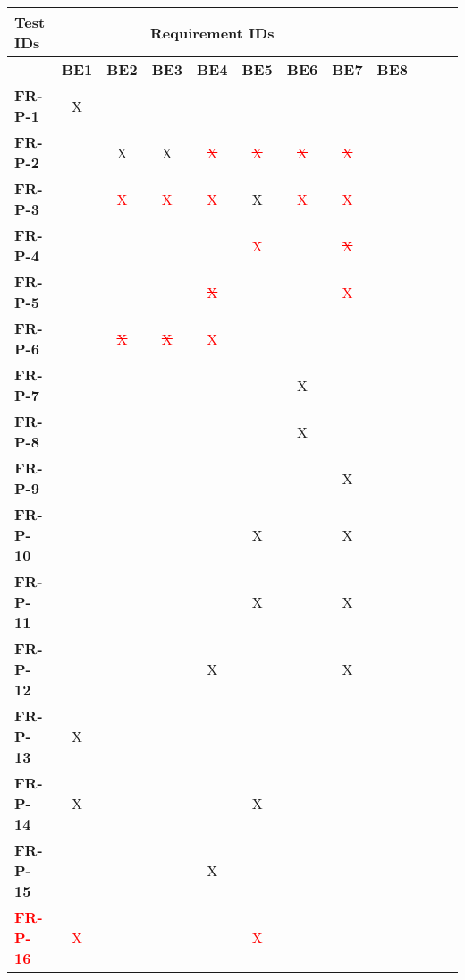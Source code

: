 \documentclass[12pt, titlepage]{article}
\begin{document}
\begin{table}[H]
    \centering
    \begin{adjustbox}{max width=0.7\paperwidth}
    \begin{tabular}{l|ccccccccccc}
        \textbf{Test IDs} & \multicolumn{7}{c}{\textbf{Requirement IDs}}\\
        \hline
        ~ & \textbf{BE1} & \textbf{BE2} & \textbf{BE3} & \textbf{BE4} & \textbf{BE5} & \textbf{BE6} & \textbf{BE7} & \textbf{BE8}\\
        \textbf{FR-P-1}    & X & ~ & ~ & ~ & ~ & ~ & ~ & ~\\
        \textbf{FR-P-2}    & ~ & X & X & \textcolor{red}{\sout{X}} & \textcolor{red}{\sout{X}} & \textcolor{red}{\sout{X}} & \textcolor{red}{\sout{X}} & ~\\
        \textbf{FR-P-3}    & ~ & \textcolor{red}{X} & \textcolor{red}{X} & \textcolor{red}{X} & X & \textcolor{red}{X} & \textcolor{red}{X} & ~\\
        \textbf{FR-P-4}    & ~ & ~ & ~ & ~ & \textcolor{red}{X} & ~ & \textcolor{red}{\sout{X}} & ~\\
        \textbf{FR-P-5}    & ~ & ~ & ~ & \textcolor{red}{\sout{X}} & ~ & ~ & \textcolor{red}{X} & ~\\
        \textbf{FR-P-6}    & ~ & \textcolor{red}{\sout{X}} & \textcolor{red}{\sout{X}} & \textcolor{red}{X} & ~ & ~ & ~ & ~\\
        \textbf{FR-P-7}    & ~ & ~ & ~ & ~ & ~ & X & ~ & ~\\
        \textbf{FR-P-8}    & ~ & ~ & ~ & ~ & ~ & X & ~ & ~\\
        \textbf{FR-P-9}    & ~ & ~ & ~ & ~ & ~ & ~ & X & ~\\
        \textbf{FR-P-10}   & ~ & ~ & ~ & ~ & X & ~ & X & ~\\
        \textbf{FR-P-11}   & ~ & ~ & ~ & ~ & X & ~ & X & ~\\
        \textbf{FR-P-12}   & ~ & ~ & ~ & X & ~ & ~ & X & ~\\
        \textbf{FR-P-13}   & X & ~ & ~ & ~ & ~ & ~ & ~ & ~\\
        \textbf{FR-P-14}   & X & ~ & ~ & ~ & X & ~ & ~ & ~\\
        \textbf{FR-P-15}   & ~ & ~ & ~ & X & ~ & ~ & ~ & ~\\
        \textcolor{red}{\textbf{FR-P-16}}   & \textcolor{red}{X} & \textcolor{red}{~} & \textcolor{red}{~} & \textcolor{red}{~} & \textcolor{red}{X} & \textcolor{red}{~} & \textcolor{red}{~} & \textcolor{red}{~} \\

\end{tabular}
\end{adjustbox}
\end{table}
\end{document}
